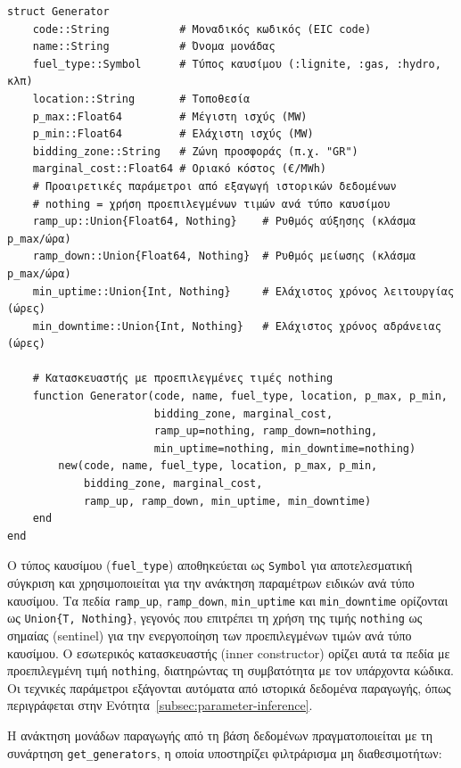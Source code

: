 \begin{samepage}
\begin{verbatim}
struct Generator
    code::String           # Μοναδικός κωδικός (EIC code)
    name::String           # Όνομα μονάδας
    fuel_type::Symbol      # Τύπος καυσίμου (:lignite, :gas, :hydro, κλπ)
    location::String       # Τοποθεσία
    p_max::Float64         # Μέγιστη ισχύς (MW)
    p_min::Float64         # Ελάχιστη ισχύς (MW)
    bidding_zone::String   # Ζώνη προσφοράς (π.χ. "GR")
    marginal_cost::Float64 # Οριακό κόστος (€/MWh)
    # Προαιρετικές παράμετροι από εξαγωγή ιστορικών δεδομένων
    # nothing = χρήση προεπιλεγμένων τιμών ανά τύπο καυσίμου
    ramp_up::Union{Float64, Nothing}    # Ρυθμός αύξησης (κλάσμα p_max/ώρα)
    ramp_down::Union{Float64, Nothing}  # Ρυθμός μείωσης (κλάσμα p_max/ώρα)
    min_uptime::Union{Int, Nothing}     # Ελάχιστος χρόνος λειτουργίας (ώρες)
    min_downtime::Union{Int, Nothing}   # Ελάχιστος χρόνος αδράνειας (ώρες)

    # Κατασκευαστής με προεπιλεγμένες τιμές nothing
    function Generator(code, name, fuel_type, location, p_max, p_min,
                       bidding_zone, marginal_cost,
                       ramp_up=nothing, ramp_down=nothing,
                       min_uptime=nothing, min_downtime=nothing)
        new(code, name, fuel_type, location, p_max, p_min,
            bidding_zone, marginal_cost,
            ramp_up, ramp_down, min_uptime, min_downtime)
    end
end
\end{verbatim}
\end{samepage}

Ο τύπος καυσίμου (\texttt{fuel\_type}) αποθηκεύεται ως \texttt{Symbol} για αποτελεσματική σύγκριση και χρησιμοποιείται για την ανάκτηση παραμέτρων ειδικών ανά τύπο καυσίμου. Τα πεδία \texttt{ramp\_up}, \texttt{ramp\_down}, \texttt{min\_uptime} και \texttt{min\_downtime} ορίζονται ως \texttt{Union\{T, Nothing\}}, γεγονός που επιτρέπει τη χρήση της τιμής \texttt{nothing} ως σημαίας (sentinel) για την ενεργοποίηση των προεπιλεγμένων τιμών ανά τύπο καυσίμου. Ο εσωτερικός κατασκευαστής (inner constructor) ορίζει αυτά τα πεδία με προεπιλεγμένη τιμή \texttt{nothing}, διατηρώντας τη συμβατότητα με τον υπάρχοντα κώδικα. Οι τεχνικές παράμετροι εξάγονται αυτόματα από ιστορικά δεδομένα παραγωγής, όπως περιγράφεται στην Ενότητα~\ref{subsec:parameter-inference}.

Η ανάκτηση μονάδων παραγωγής από τη βάση δεδομένων πραγματοποιείται με τη συνάρτηση \texttt{get\_generators}, η οποία υποστηρίζει φιλτράρισμα μη διαθεσιμοτήτων:

